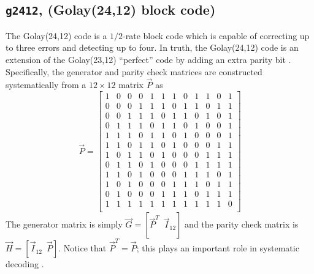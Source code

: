 \subsection{{\tt g2412}, (Golay(24,12) block code)}
\label{module:fec:golay}
The Golay(24,12) code is a $1/2$-rate block code which is capable of
correcting up to three errors and detecting up to four.
In truth, the Golay(24,12) code is an extension of the Golay(23,12)
``perfect'' code by adding an extra parity bit \cite[\S4.6]{Lin:2004}.
Specifically, the generator and parity check matrices are constructed
systematically from a $12 \times 12$ matrix $\vec{P}$ as
%
\begin{equation}
    \vec{P} = 
    \begin{bmatrix}
        1 & 0 & 0 & 0 & 1 & 1 & 1 & 0 & 1 & 1 & 0 &  1 \\
        0 & 0 & 0 & 1 & 1 & 1 & 0 & 1 & 1 & 0 & 1 &  1 \\
        0 & 0 & 1 & 1 & 1 & 0 & 1 & 1 & 0 & 1 & 0 &  1 \\
        0 & 1 & 1 & 1 & 0 & 1 & 1 & 0 & 1 & 0 & 0 &  1 \\
        1 & 1 & 1 & 0 & 1 & 1 & 0 & 1 & 0 & 0 & 0 &  1 \\
        1 & 1 & 0 & 1 & 1 & 0 & 1 & 0 & 0 & 0 & 1 &  1 \\
        1 & 0 & 1 & 1 & 0 & 1 & 0 & 0 & 0 & 1 & 1 &  1 \\
        0 & 1 & 1 & 0 & 1 & 0 & 0 & 0 & 1 & 1 & 1 &  1 \\
        1 & 1 & 0 & 1 & 0 & 0 & 0 & 1 & 1 & 1 & 0 &  1 \\
        1 & 0 & 1 & 0 & 0 & 0 & 1 & 1 & 1 & 0 & 1 &  1 \\
        0 & 1 & 0 & 0 & 0 & 1 & 1 & 1 & 0 & 1 & 1 &  1 \\
        1 & 1 & 1 & 1 & 1 & 1 & 1 & 1 & 1 & 1 & 1 &  0 \\
    \end{bmatrix}
\end{equation}
%
The generator matrix is simply
$\vec{G} = \left[ \vec{P}^T \,\,\, \vec{I}_{12} \right]$
and the parity check matrix is
$\vec{H} = \left[ \vec{I}_{12} \,\,\, \vec{P} \right]$.
Notice that $\vec{P}^T = \vec{P}$; this plays an important role in
systematic decoding \cite{Berlekamp:1972}.

